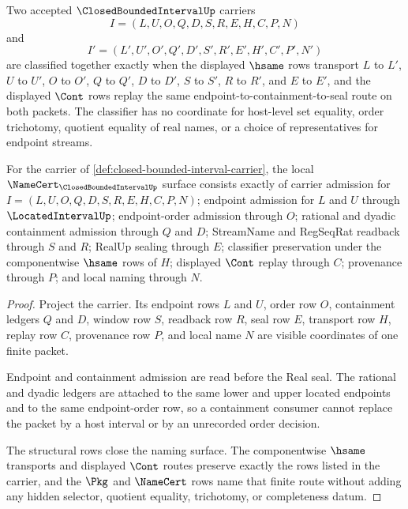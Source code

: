 \begin{definition}
\label{def:closed-bounded-interval-classifier}
Two accepted $\ClosedBoundedIntervalUp$ carriers
$$
I=(L,U,O,Q,D,S,R,E,H,C,P,N)
$$
and
$$
I'=(L',U',O',Q',D',S',R',E',H',C',P',N')
$$
are classified together exactly when the displayed $\hsame$ rows transport $L$ to $L'$, $U$ to $U'$, $O$ to $O'$, $Q$ to $Q'$, $D$ to $D'$, $S$ to $S'$, $R$ to $R'$, and $E$ to $E'$, and the displayed $\Cont$ rows replay the same endpoint-to-containment-to-seal route on both packets. The classifier has no coordinate for host-level set equality, order trichotomy, quotient equality of real names, or a choice of representatives for endpoint streams.
\end{definition}

\begin{theorem}
\label{thm:closed-bounded-interval-namecert-obligations}
For the carrier of \autoref{def:closed-bounded-interval-carrier}, the local $\NameCert_{\ClosedBoundedIntervalUp}$ surface consists exactly of carrier admission for $I=(L,U,O,Q,D,S,R,E,H,C,P,N)$; endpoint admission for $L$ and $U$ through $\LocatedIntervalUp$; endpoint-order admission through $O$; rational and dyadic containment admission through $Q$ and $D$; StreamName and RegSeqRat readback through $S$ and $R$; RealUp sealing through $E$; classifier preservation under the componentwise $\hsame$ rows of $H$; displayed $\Cont$ replay through $C$; provenance through $P$; and local naming through $N$.
\end{theorem}
\begin{proof}
Project the carrier. Its endpoint rows $L$ and $U$, order row $O$, containment ledgers $Q$ and $D$, window row $S$, readback row $R$, seal row $E$, transport row $H$, replay row $C$, provenance row $P$, and local name $N$ are visible coordinates of one finite packet.

Endpoint and containment admission are read before the Real seal. The rational and dyadic ledgers are attached to the same lower and upper located endpoints and to the same endpoint-order row, so a containment consumer cannot replace the packet by a host interval or by an unrecorded order decision.

The structural rows close the naming surface. The componentwise $\hsame$ transports and displayed $\Cont$ routes preserve exactly the rows listed in the carrier, and the $\Pkg$ and $\NameCert$ rows name that finite route without adding any hidden selector, quotient equality, trichotomy, or completeness datum.
\end{proof}

